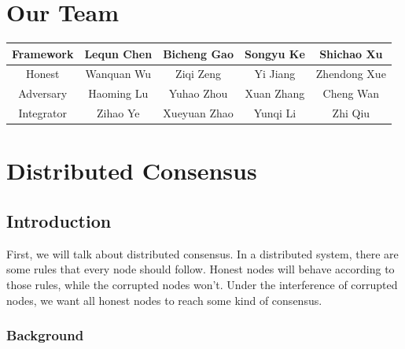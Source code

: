 \documentclass[
10pt, %
a4paper, %
oneside, %
headinclude,footinclude, %
BCOR5mm, %
]{scrartcl}
\begin{document}
\section{Our Team}

\begin{table}[h]
    \centering
    \begin{tabular}{|c|c|c|c|c|}
        \hline
        Framework  & Lequn Chen & Bicheng Gao  & Songyu Ke  & Shichao Xu   \\ \hline
        Honest     & Wanquan Wu & Ziqi Zeng    & Yi Jiang   & Zhendong Xue \\ \hline
        Adversary  & Haoming Lu & Yuhao Zhou   & Xuan Zhang & Cheng Wan    \\ \hline
        Integrator & Zihao Ye   & Xueyuan Zhao & Yunqi Li   & Zhi Qiu      \\ \hline
    \end{tabular}
\end{table}

\section{Distributed Consensus}

\subsection{Introduction}

First, we will talk about distributed consensus. In a distributed system, there are some rules that every node should follow. Honest nodes will behave according to those rules, while the corrupted nodes won't. Under the interference of corrupted nodes, we want all honest nodes to reach some kind of consensus. 

\subsubsection{Background}
\end{document}
